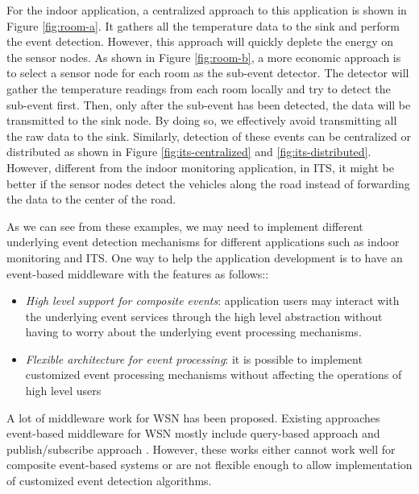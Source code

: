 For the indoor application, a centralized approach to this application is shown in Figure \ref{fig:room-a}. It gathers all the temperature data to the sink and perform the event detection. However, this approach will quickly deplete the energy on the sensor nodes. As shown in Figure \ref{fig:room-b}, a more economic approach is to select a sensor node for each room as the sub-event detector. The detector will gather the temperature readings from each room locally and try to detect the sub-event first. Then, only after the sub-event has been detected, the data will be transmitted to the sink node. By doing so, we effectively avoid transmitting all the raw data to the sink. Similarly, detection of these events can be centralized or distributed as shown in Figure \ref{fig:its-centralized} and \ref{fig:its-distributed}. However, different from the indoor monitoring application, in ITS, it might be better if the sensor nodes detect the vehicles along the road instead of forwarding the data to the center of the road. 

As we can see from these examples, we may need to implement different underlying event detection mechanisms for different applications such as indoor monitoring and ITS. One way to help the application development is to have an event-based middleware with the features as follows::
\begin{itemize}
\item \emph{High level support for composite events}: application users may interact with the underlying event services through the high level abstraction without having to worry about the underlying event processing mechanisms.
\item \emph{Flexible architecture for event processing}: it is possible to implement customized event processing mechanisms without affecting the operations of high level users
\end{itemize}

A lot of middleware work for WSN has been proposed. Existing approaches event-based middleware for WSN mostly include query-based approach \cite{tinydb} and publish/subscribe approach \cite{complexevent}. However, these works either cannot work well for composite event-based systems or are not flexible enough to allow implementation of customized event detection algorithms. 


